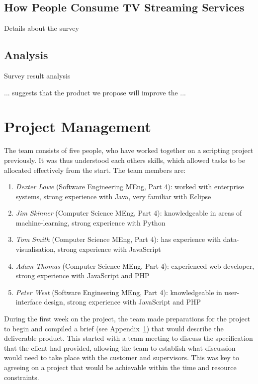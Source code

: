 \documentclass[12pt,a4paper,twoside, titlepage, openright, cleardoublepage=empty]{article}
\begin{document}
\subsection{How People Consume TV Streaming Services}
Details about the survey

\subsection{Analysis}
Survey result analysis

... suggests that the product we propose will improve the ...

\cleardoublepage

\section{Project Management}

The team consists of five people, who have worked together on a scripting project previously. It was thus understood each others skills, which allowed tasks to be allocated effectively from the start. The team members are:
\begin{enumerate}
\item \textit{Dexter Lowe} (Software Engineering MEng, Part 4): worked with enterprise systems, strong experience with Java, very familiar with Eclipse
\item \textit{Jim Skinner} (Computer Science MEng, Part 4): knowledgeable in areas of machine-learning, strong experience with Python
\item \textit{Tom Smith} (Computer Science MEng, Part 4): has experience with data-visualisation, strong experience with JavaScript
\item \textit{Adam Thomas} (Computer Science MEng, Part 4): experienced web developer, strong experience with JavaScript and PHP
\item \textit{Peter West} (Software Engineering MEng, Part 4): knowledgeable in user-interface design, strong experience with JavaScript and PHP
\end{enumerate}

During the first week on the project, the team made preparations for the project to begin and compiled a brief (see Appendix~\ref{}) that would describe the deliverable product. This started with a team meeting to discuss the specification that the client had provided, allowing the team to establish what discussion would need to take place with the customer and supervisors. This was key to agreeing on a project that would be achievable within the time and resource constraints.
\end{document}
